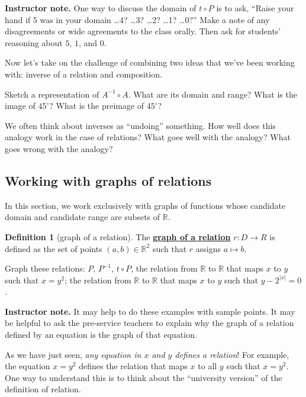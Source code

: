 \documentclass[11pt]{article}
\newcommand\smallnote[1]
	{\begin{mdframed}\raggedright  {\bf Instructor note.} {#1} \end{mdframed}}
\newenvironment{task}
	{\begin{mdframed}[linecolor=lightgray, linewidth=3pt]\raggedright}
	{\end{mdframed}}
\newcommand{\R}{\mathbb{R}}
\newcommand\degrees{^\circ}
\renewcommand\emph[1]{\underline{\bf{#1}}} %
\theoremstyle{definition}
\newtheorem{definition}[theorem]{Definition}
\begin{document}
\smallnote{One way to discuss the domain of $t\circ P$ is to ask, ``Raise your hand if 5 was in your domain \dots 4? \dots 3? \dots 2? \dots 1? \dots 0?'' Make a note of any disagreements or wide agreements to the class orally. Then ask for students' reasoning about $5$, $1$, and $0$.}

Now let's take on the challenge of combining two ideas that we've been working with: inverse of a relation and composition.
\begin{task}
Sketch a representation of $A^{-1}\circ A$. What are its domain and range? What is the image of $45\degrees$? What is the preimage of $45\degrees$?
\end{task}

\begin{task}
We often think about inverses as ``undoing'' something. How well does this analogy work in the case of relations? What goes well with the analogy? What goes wrong with the analogy?
\end{task}

\subsection{Working with graphs of relations}

In this section, we work exclusively with graphs of functions whose candidate domain and candidate range are subsets of $\R$. 
 
\begin{definition}[graph of a relation]\label{d: graph of a relation}
The \emph{graph of a relation} $r:D\to R$ is defined as the set of points $(a, b)\in \R^2$ such that $r$ assigns $a\mapsto b$.
\end{definition}

\vspace*{-8pt}
\begin{task}
Graph these relations: $P$, $P^{-1}$, $t\circ P$, the relation from $\R$ to $\R$ that maps $x$ to $y$ such that $x=y^2$; the relation from $\R$ to $\R$ that maps $x$ to $y$ such that $y-2^{|x|}=0$.
\end{task}

\vspace*{-12pt}
\smallnote{It may help to do these examples with sample points. It may be helpful to ask the pre-service teachers to explain why the graph of a relation defined by an equation is the graph of that equation.}

As we have just seen, {\it any equation in $x$ and $y$ defines a relation}! For example, the equation $x=y^2$ defines the relation that maps $x$ to all $y$ such that $x=y^2$.  One way to understand this is to think about the ``university version'' of the definition of relation.
\end{document}
